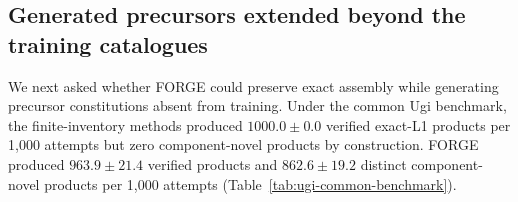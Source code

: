 \documentclass{article}
\theoremstyle{definition}
\newcommand{\ForgeProseCommonForgeDistinctPerThousand}{$862.6\pm19.2$}
\newcommand{\ForgeProseCommonForgeExactPerThousand}{$963.9\pm21.4$}
\newcommand{\ForgeProseCommonSelectorExactPerThousand}{$1000.0\pm0.0$}
\begin{document}
\subsection{Generated precursors extended beyond the training catalogues}
We next asked whether FORGE could preserve exact assembly while generating precursor constitutions
absent from training. Under the common Ugi benchmark, the finite-inventory methods produced
\ForgeProseCommonSelectorExactPerThousand{} verified exact-L1 products per 1,000 attempts but zero
component-novel products by construction. FORGE produced
\ForgeProseCommonForgeExactPerThousand{} verified products and
\ForgeProseCommonForgeDistinctPerThousand{} distinct component-novel products per 1,000 attempts
(Table~\ref{tab:ugi-common-benchmark}).

\begin{table}[htbp]
\caption{\textbf{Exact Ugi assembly with precursor constitutions absent from
method-visible training.} Values are mean $\pm$ sample standard deviation per 1,000 attempts across
three seeds under a common component-disjoint protocol and verifier. Component-novel is
verifier-relative and does not establish strong product-level catalogue escape. Whole-molecule
baselines are assessed post hoc. $\dagger$, structural zero; N/E, not estimable.}
\label{tab:ugi-common-benchmark}
\centering
\scriptsize
\setlength{\tabcolsep}{2.2pt}
\end{table}
\end{document}
